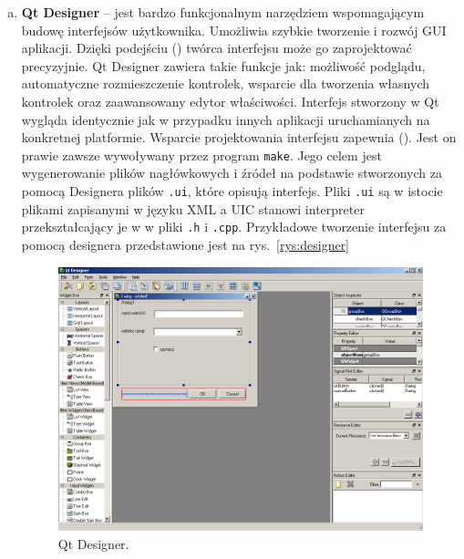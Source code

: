 \begin{enumerate}[a)]
	\item \textbf{Qt Designer} -- jest bardzo funkcjonalnym narzędziem wspomagającym budowę interfejsów użytkownika. Umożliwia szybkie tworzenie i rozwój 
	GUI aplikacji. Dzięki podejściu  () twórca interfejsu może go zaprojektować precyzyjnie. 
	Qt Designer zawiera takie funkcje jak: możliwość podglądu, automatyczne rozmieszczenie kontrolek, wsparcie dla tworzenia własnych kontrolek oraz 
	zaawansowany edytor właściwości. Interfejs stworzony w Qt wygląda identycznie jak w przypadku innych aplikacji uruchamianych na konkretnej 
	platformie. Wsparcie projektowania interfejsu zapewnia  (). Jest on prawie zawsze wywoływany przez 
	program \texttt{make}. Jego celem jest wygenerowanie plików nagłówkowych i źródeł na podstawie stworzonych za pomocą Designera plików \texttt{.ui}, które 
	opisują interfejs. Pliki \texttt{.ui} są w istocie plikami zapisanymi w języku XML a UIC stanowi interpreter przekształcający je w w pliki 
	\texttt{.h} i \texttt{.cpp}. Przykładowe tworzenie interfejsu za pomocą designera przedstawione jest na rys.~\vref{rys:designer}
	\begin{figure}[p]
	\centering\includegraphics[scale=0.4]{figures/designer.png}
	\caption{Qt Designer.}\label{rys:designer}
	\end{figure}
	

\end{enumerate}
